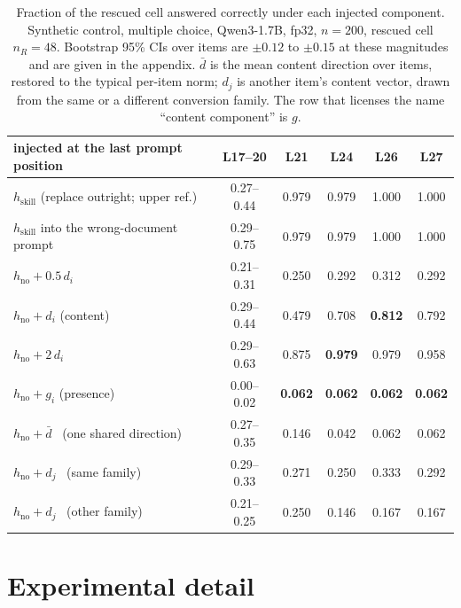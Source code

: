 \documentclass{article}
\newcommand{\dvec}{\ensuremath{d}}
\newcommand{\gvec}{\ensuremath{g}}
\begin{document}
\begin{table}[h]
\caption{Fraction of the rescued cell answered correctly under each injected
component. Synthetic control, multiple choice, Qwen3-1.7B, fp32, $n=200$,
rescued cell $n_R=48$. Bootstrap 95\% CIs over items are $\pm0.12$ to $\pm0.15$
at these magnitudes and are given in the appendix. $\bar{\dvec}$ is the mean
content direction over items, restored to the typical per-item norm; $\dvec_j$
is another item's content vector, drawn from the same or a different conversion
family. The row that licenses the name ``content component'' is $\gvec$.}
\label{tab:causal}
\centering
\small
\begin{tabular}{lccccc}
\toprule
injected at the last prompt position & L17--20 & L21 & L24 & L26 & L27\\
\midrule
$h_{\text{skill}}$ (replace outright; upper ref.)
  & 0.27--0.44 & 0.979 & 0.979 & 1.000 & 1.000 \\
$h_{\text{skill}}$ into the wrong-document prompt
  & 0.29--0.75 & 0.979 & 0.979 & 1.000 & 1.000 \\
\midrule
$h_{\text{no}} + 0.5\,\dvec_i$
  & 0.21--0.31 & 0.250 & 0.292 & 0.312 & 0.292 \\
$h_{\text{no}} + \dvec_i$ \quad (content)
  & 0.29--0.44 & 0.479 & 0.708 & \textbf{0.812} & 0.792 \\
$h_{\text{no}} + 2\,\dvec_i$
  & 0.29--0.63 & 0.875 & \textbf{0.979} & 0.979 & 0.958 \\
\midrule
$h_{\text{no}} + \gvec_i$ \quad (presence)
  & 0.00--0.02 & \textbf{0.062} & \textbf{0.062} & \textbf{0.062} & \textbf{0.062} \\
$h_{\text{no}} + \bar{\dvec}$ \ (one shared direction)
  & 0.27--0.35 & 0.146 & 0.042 & 0.062 & 0.062 \\
$h_{\text{no}} + \dvec_j$ \ (same family)
  & 0.29--0.33 & 0.271 & 0.250 & 0.333 & 0.292 \\
$h_{\text{no}} + \dvec_j$ \ (other family)
  & 0.21--0.25 & 0.250 & 0.146 & 0.167 & 0.167 \\
\bottomrule
\end{tabular}
\end{table}

\section{Experimental detail}
\label{app:detail}
\end{document}
